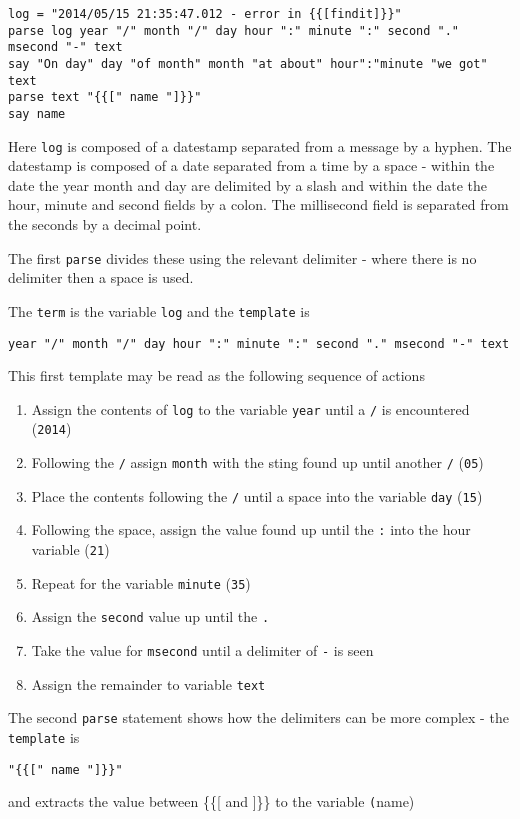 {\begin{lstlisting}[label=SimpleParseExample, caption=Simple Parse Example]
log = "2014/05/15 21:35:47.012 - error in {{[findit]}}"
parse log year "/" month "/" day hour ":" minute ":" second "." msecond "-" text
say "On day" day "of month" month "at about" hour":"minute "we got" text
parse text "{{[" name "]}}"
say name
\end{lstlisting}

Here \texttt{log}  is composed of a datestamp separated from a message by a hyphen. The datestamp is composed of a date separated from a time by a space - within the date the year month and day are delimited by a slash and within the date the hour, minute and second fields by a colon. The millisecond field is separated from the seconds by a decimal point.

The first \texttt{parse} divides these using the relevant delimiter - where there is no delimiter then a space is used.

The \texttt{term} is the variable \texttt{log} and the \texttt{template} is 
\begin{verbatim}
year "/" month "/" day hour ":" minute ":" second "." msecond "-" text
\end{verbatim}

This first template may be read as the following sequence of actions
\begin{enumerate}
\item Assign the contents of \texttt{log} to the variable \texttt{year} until a \texttt{/} is encountered (\texttt{2014})
\item Following the \texttt{/} assign \texttt{month} with the sting found up until another \texttt{/} (\texttt{05})
\item Place the contents following the \texttt{/} until a space into the variable \texttt{day} (\texttt{15})
\item Following the space, assign the value found up until the \texttt{:} into the hour variable (\texttt{21})
\item Repeat for the variable \texttt{minute} (\texttt{35})
\item Assign the \texttt{second} value up until the \texttt{.}
\item Take the value for \texttt{msecond} until a delimiter of \texttt{-} is seen
\item Assign the remainder to variable \texttt{text}
\end{enumerate}

The second \texttt{parse} statement shows how the delimiters can be more complex - the \texttt{template} is 
\begin{verbatim}
"{{[" name "]}}"
\end{verbatim}
and extracts the value between \{\{[ and ]\}\} to the variable \texttt(name)

}
